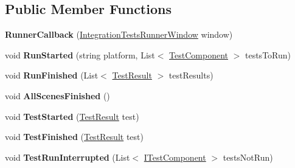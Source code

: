 \subsection*{Public Member Functions}
\begin{DoxyCompactItemize}
\item 
\mbox{\label{class_unity_test_1_1_integration_tests_runner_window_1_1_runner_callback_ae7a44d6b4108fbbce5a88cf564ec0733}} 
{\bfseries Runner\+Callback} (\hyperlink{class_unity_test_1_1_integration_tests_runner_window}{Integration\+Tests\+Runner\+Window} window)
\item 
\mbox{\label{class_unity_test_1_1_integration_tests_runner_window_1_1_runner_callback_ad04fadeef0e4c3e17bb686c56ae11d35}} 
void {\bfseries Run\+Started} (string platform, List$<$ \hyperlink{class_unity_test_1_1_test_component}{Test\+Component} $>$ tests\+To\+Run)
\item 
\mbox{\label{class_unity_test_1_1_integration_tests_runner_window_1_1_runner_callback_a85d3ce10a8d59762f951a841bdad357a}} 
void {\bfseries Run\+Finished} (List$<$ \hyperlink{class_unity_test_1_1_test_result}{Test\+Result} $>$ test\+Results)
\item 
\mbox{\label{class_unity_test_1_1_integration_tests_runner_window_1_1_runner_callback_a798d0c0004f4922c5286d2735f430c07}} 
void {\bfseries All\+Scenes\+Finished} ()
\item 
\mbox{\label{class_unity_test_1_1_integration_tests_runner_window_1_1_runner_callback_a94a3e098bcd9d48b848cb949d56af228}} 
void {\bfseries Test\+Started} (\hyperlink{class_unity_test_1_1_test_result}{Test\+Result} test)
\item 
\mbox{\label{class_unity_test_1_1_integration_tests_runner_window_1_1_runner_callback_a18a42980652896b8e96f4aa5079b399c}} 
void {\bfseries Test\+Finished} (\hyperlink{class_unity_test_1_1_test_result}{Test\+Result} test)
\item 
\mbox{\label{class_unity_test_1_1_integration_tests_runner_window_1_1_runner_callback_ab1f2995f7dd80105357540b908bee701}} 
void {\bfseries Test\+Run\+Interrupted} (List$<$ \hyperlink{interface_unity_test_1_1_i_test_component}{I\+Test\+Component} $>$ tests\+Not\+Run)
\end{DoxyCompactItemize}

